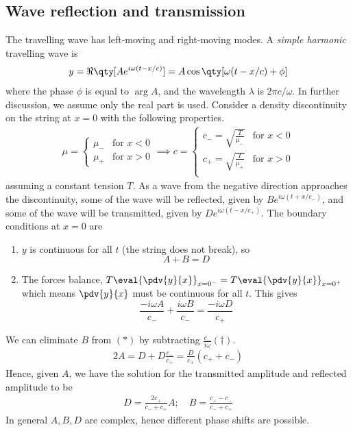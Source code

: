 \subsection{Wave reflection and transmission}
The travelling wave has left-moving and right-moving modes.
A \textit{simple harmonic} travelling wave is
\begin{align*}
	y = \Re\qty[ A e^{i \omega(t-x/c)} ] = A \cos \qty[\omega(t-x/c) + \phi]
\end{align*}
where the phase $\phi$ is equal to $\arg A$, and the wavelength $\lambda$ is $2 \pi c / \omega$.
In further discussion, we assume only the real part is used.
Consider a density discontinuity on the string at $x = 0$ with the following properties.
\begin{align*}
	\mu = \begin{cases}
		\mu_- & \text{for } x < 0 \\
		\mu_+ & \text{for } x > 0
	\end{cases} \implies c = \begin{cases}
		c_- = \sqrt{\frac{T}{\mu_-}} & \text{for } x < 0 \\
		c_+ = \sqrt{\frac{T}{\mu_+}} & \text{for } x > 0 \\
	\end{cases}
\end{align*}
assuming a constant tension $T$.
As a wave from the negative direction approaches the discontinuity, some of the wave will be reflected, given by $B e^{i \omega(t + x/c_-)}$, and some of the wave will be transmitted, given by $D e^{i \omega(t - x/c_+)}$.
The boundary conditions at $x = 0$ are
\begin{enumerate}
	\item $y$ is continuous for all $t$ (the string does not break), so
	      \begin{equation}
		      A + B = D \tag{$\ast$}
	      \end{equation}
	\item The forces balance, $T \eval{\pdv{y}{x}}_{x = 0^-} = T \eval{\pdv{y}{x}}_{x = 0^+}$ which means $\pdv{y}{x}$ must be continuous for all $t$.
	      This gives
	      \begin{equation}
		      \frac{-i\omega A}{c_-} + \frac{i \omega B}{c_-} = \frac{-i \omega D}{c_+} \tag{$\dagger$}
	      \end{equation}
\end{enumerate}
We can eliminate $B$ from $(\ast)$ by subtracting $\frac{c_-}{i \omega}(\dagger)$.
\begin{align*}
	2A = D + D \frac{c_-}{c_+} = \frac{D}{c_+}(c_+ + c_-)
\end{align*}
Hence, given $A$, we have the solution for the transmitted amplitude and reflected amplitude to be
\begin{align*}
	D = \frac{2 c_+}{c_- + c_+} A;\quad B = \frac{c_+ - c_-}{c_- + c_+}
\end{align*}
In general $A, B, D$ are complex, hence different phase shifts are possible.

